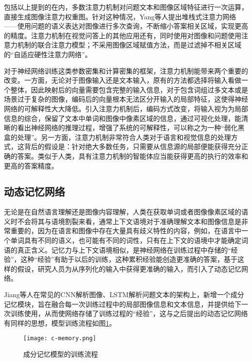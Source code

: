 包括以上提到的在内，多数注意力机制对问题文本和图像区域特征进行一次运算，直接生成图像注意力权重图。针对这种情况，Yang等人提出堆栈式注意力网络——使用问题的语义表达对图像进行多次查询，不断缩小答案相关区域，实现更高的精度。注意力机制在视觉问答上的其他应用还有，同时使用对图像和问题使用注意力机制的联合注意力模型；不采用图像区域赋值方法，而是过滤掉不相关区域的“自适应硬性注意力网络”。

对于神经网络训练这类参数密集和计算密集的框架，注意力机制能带来两个重要的改变。一方面，无论对于图像输入还是文本输入，原有的方法都选择将输入看做一个整体，因此映射后的向量需要包含完整的输入信息，对于包含词组过多文本或是场景过于复杂的图像，编码后的向量根本无法区分开输入的局部特征，这使得神经网络的可解释性大大降低。引入注意力机制后，编码方式改变，将输入视为为局部信息的综合，保留了文本中单词和图像中像素区域的信息，通过可视化处理，能清晰的看出神经网络的推理过程，增强了系统的可解释性，可以称之为一种“弱化黑盒的处理”。另一方面，注意力机制非常符合人类对于语言和视觉信息的处理方式，这背后的假设是：针对绝大多数任务，只需要从信息源的局部便能获得充分正确的答案。类似于人类，具有注意力机制的智能体应当能获得更高的执行的效率和更高的答案精度。

\subsection{动态记忆网络}
无论是在自然语言理解还是图像内容理解，人类在获取单词或者图像像素区域的语义时不会将其与语境割裂来看，通常上下文语境对于准确理解文本和图像信息是非常重要的，因为在语言和图像中存在大量具有歧义特性的内容，例如，在语言中一个单词具有不同的语义，也可能有不同的词性，只有在上下文的语境中才能确定词语的真正含义。记忆力与上下文语境相似，是神经网络在训练过程中存储的“经验”，这种“经验”有助于以后的训练，这种累积经验能创造更准确的答案，基于这样的假设，研究人员为从序列化的输入中获得更准确的输入，而引入了动态记忆网络。

Jiang等人在常见的CNN解析图像、LSTM解析问题文本的架构上，新增一个成分记忆模块，旨在融合每一次训练过程中的局部图像信息和文本信息，并提供给下一次训练使用，从而使网络存储了训练过程的“经验”，这与之后提出的动态记忆网络有同样的思想，模型训练流程如图\ref{c-memory}。
\begin{figure}[H]
	\centering
	\texttt{[image: c-memory.png]}
	\caption{成分记忆模型的训练流程}
	\label{c-memory}
\end{figure}

